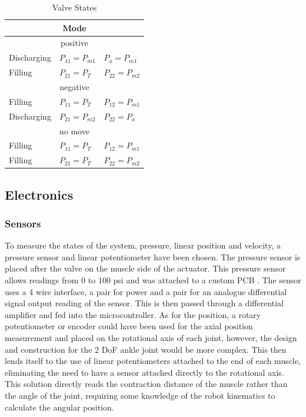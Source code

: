 \documentclass[11pt,a4paper]{article}
\begin{document}
\begin{table}[!hbt]
    \centering
    \caption{Valve States}
    \begin{tabular}{l l l}
        \multicolumn{3}{c}{\textbf{Mode}} \\
        \hline
            \multicolumn{3}{c}{positive}\\
        \hline
            Discharging & $P_{11} = P_{m1}$ & $P_{a} = P_{m1}$ \\
            Filling & $P_{21} = P_{T}$ & $P_{22} = P_{m2}$ \\
        \hline
            \multicolumn{3}{c}{negative}\\
        \hline   
            Filling & $P_{11} = P_{T}$ & $P_{12} = P_{m1}$\\
            Discharging & $P_{21} = P_{m2}$ & $P_{22} = P_{a}$\\
        \hline
            \multicolumn{3}{c}{no move}\\
        \hline    
            Filling & $P_{11} = P_{T}$ & $P_{12} = P_{m1}$\\
            Filling & $P_{21} = P_{T}$ & $P_{22} = P_{m2}$\\
        \hline
    \end{tabular}
    \label{tab:valve_states}
\end{table}

\subsection{Electronics}
\label{subsection:electronics}

\subsubsection{Sensors}
\label{sub:sensors}

To measure the states of the system, pressure, linear position and velocity, a pressure sensor and linear potentiometer have been chosen. The pressure sensor is placed after the valve on the muscle side of the actuator. This pressure sensor \cite{NBPLANN100PGUNV} allows readings from 0 to 100 psi and was attached to a custom PCB . The sensor uses a 4 wire interface, a pair for power and a pair for an analogue differential signal output reading of the sensor. This is then passed through a differential amplifier and fed into the microcontroller. As for the position, a rotary potentiometer or encoder could have been used for the axial position measurement and placed on the rotational axis of each joint, however, the design and construction for the 2 DoF ankle joint would be more complex. This then lends itself to the use of linear potentiometers attached to the end of each muscle, eliminating the need to have a sensor attached directly to the rotational axis. This solution directly reads the contraction distance of the muscle rather than the angle of the joint, requiring some knowledge of the robot kinematics to calculate the angular position.
\end{document}
